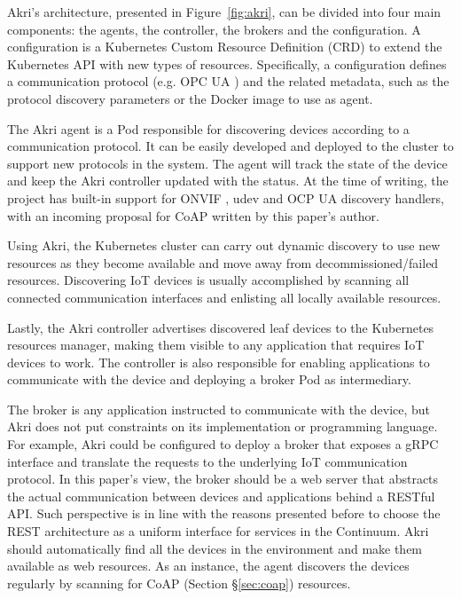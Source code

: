 Akri's architecture, presented in Figure~\ref{fig:akri}, can be divided into four main components: the agents, the controller, the brokers and the configuration. A configuration is a Kubernetes Custom Resource Definition (CRD) to extend the Kubernetes API with new types of resources. Specifically, a configuration defines a communication protocol (e.g. OPC UA \cite{gruner2016restful}) and the related metadata, such as the protocol discovery parameters or the Docker image to use as agent.

The Akri agent is a Pod responsible for discovering devices according to a communication protocol. It can be easily developed and deployed to the cluster to support new protocols in the system. The agent will track the state of the device and keep the Akri controller updated with the status. At the time of writing, the project has built-in support for ONVIF \cite{onvif}, udev \cite{udev} and OCP UA \cite{gruner2016restful} discovery handlers, with an incoming proposal for CoAP \cite{bormann2012coap} written by this paper's author.

Using Akri, the Kubernetes cluster can carry out dynamic discovery to use new resources as they become available and move away from decommissioned/failed resources. Discovering IoT devices is usually accomplished by scanning all connected communication interfaces and enlisting all locally available resources.

Lastly, the Akri controller advertises discovered leaf devices to the Kubernetes resources manager, making them visible to any application that requires IoT devices to work. The controller is also responsible for enabling applications to communicate with the device and deploying a broker Pod as intermediary. 

The broker is any application instructed to communicate with the device, but Akri does not put constraints on its implementation or programming language. For example, Akri could be configured to deploy a broker that exposes a gRPC \cite{gRPC} interface and translate the requests to the underlying IoT communication protocol. In this paper's view, the broker should be a web server that abstracts the actual communication between devices and applications behind a RESTful API. Such perspective is in line with the reasons presented before to choose the REST architecture as a uniform interface for services in the Continuum. Akri should automatically find all the devices in the environment and make them available as web resources. As an instance, the agent discovers the devices regularly by scanning for CoAP (Section §\ref{sec:coap}) resources.

